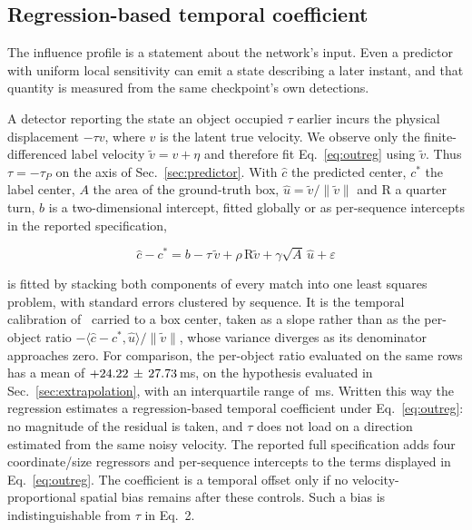 \documentclass[10pt,twocolumn,letterpaper]{article}
\begin{document}
\subsection{Regression-based temporal coefficient}
\label{sec:outputtime}

The influence profile is a statement about the network's input. Even a predictor
with uniform local sensitivity can emit a state describing a later instant,
and that quantity is measured from the same checkpoint's own detections.

A detector reporting the state an object occupied $\tau$ earlier incurs the
physical displacement $-\tau v$, where $v$ is the latent true velocity. We
observe only the finite-differenced label velocity $\tilde v=v+\eta$ and
therefore fit Eq.~\ref{eq:outreg} using $\tilde v$. Thus
$\tau=-\tau_{P}$ on the axis of Sec.~\ref{sec:predictor}. With $\hat{c}$ the
predicted center, $c^{*}$ the label center, $A$ the area of the ground-truth
box, $\hat{u}=\tilde v/\lVert \tilde v\rVert$ and $\mathrm{R}$ a quarter turn,
$b$ is a two-dimensional intercept, fitted globally or as per-sequence
intercepts in the reported specification,

\begin{equation}
\hat{c}-c^{*}=b-\tau\,\tilde v+\rho\,\mathrm{R}\tilde v+\gamma\sqrt{A}\,\hat{u}+\varepsilon
\label{eq:outreg}
\end{equation}

\noindent is fitted by stacking both components of every match into one least
squares problem, with standard errors clustered by sequence. It is the temporal
calibration of~\cite{qin2018temporal} carried to a box center, taken as a slope
rather than as the per-object ratio $-\langle
\hat{c}-c^{*},\hat{u}\rangle/\lVert \tilde v\rVert$, whose variance diverges as its
denominator approaches zero. For comparison, the per-object ratio evaluated on
the same rows has a mean of
$+24.22\,\pm\,27.73$\,ms, on the hypothesis evaluated in
Sec.~\ref{sec:extrapolation}, with an interquartile range of \ratioIQR\,ms.
Written this way the
regression estimates a regression-based temporal coefficient under
Eq.~\ref{eq:outreg}: no magnitude of the residual is taken, and $\tau$
does not load on a direction estimated from the same noisy velocity.
The reported full specification adds four coordinate/size regressors and
per-sequence intercepts to the terms displayed in Eq.~\ref{eq:outreg}.
The coefficient is a temporal offset only if no velocity-proportional spatial
bias remains after these controls. Such a bias is indistinguishable from $\tau$ in Eq.~2.
\end{document}
